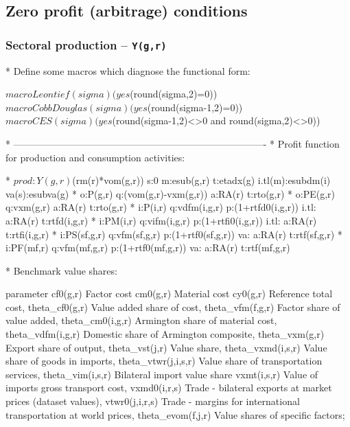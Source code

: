 \subsection*{Zero profit (arbitrage) conditions}

\subsubsection*{Sectoral production -- \texttt{Y(g,r)}}

\begin{GAMSCode*}
*       Define some macros which diagnose the functional form:

$macro  Leontief(sigma)         (yes$(round(sigma,2)=0))
$macro  CobbDouglas(sigma)      (yes$(round(sigma-1,2)=0))
$macro  CES(sigma)              (yes$(round(sigma-1,2)<>0 and round(sigma,2)<>0))

*       -------------------------------------------------------------------------------
*       Profit function for production and consumption activities:

* $prod:Y(g,r)$(rm(r)*vom(g,r)) s:0 m:esub(g,r) t:etadx(g) i.tl(m):esubdm(i)  va(s):esubva(g)
*       o:P(g,r)        q:(vom(g,r)-vxm(g,r))   a:RA(r)  t:rto(g,r)
*       o:PE(g,r)       q:vxm(g,r)              a:RA(r)  t:rto(g,r)
*       i:P(i,r)        q:vdfm(i,g,r)   p:(1+rtfd0(i,g,r)) i.tl:  a:RA(r) t:rtfd(i,g,r)
*       i:PM(i,r)       q:vifm(i,g,r)   p:(1+rtfi0(i,g,r)) i.tl:  a:RA(r) t:rtfi(i,g,r)
*       i:PS(sf,g,r)    q:vfm(sf,g,r)   p:(1+rtf0(sf,g,r))  va:   a:RA(r) t:rtf(sf,g,r)
*       i:PF(mf,r)      q:vfm(mf,g,r)   p:(1+rtf0(mf,g,r))  va:   a:RA(r) t:rtf(mf,g,r)

*       Benchmark value shares:

parameter
        cf0(g,r)                Factor cost
        cm0(g,r)                Material cost
        cy0(g,r)                Reference total cost,
        theta_cf0(g,r)          Value added share of cost,
        theta_vfm(f,g,r)        Factor share of value added,
        theta_cm0(i,g,r)        Armington share of material cost,
        theta_vdfm(i,g,r)       Domestic share of Armington composite,
        theta_vxm(g,r)          Export share of output,
        theta_vst(j,r)          Value share,
        theta_vxmd(i,s,r)       Value share of goods in imports,
        theta_vtwr(j,i,s,r)     Value share of transportation services,
        theta_vim(i,s,r)        Bilateral import value share
        vxmt(i,s,r)             Value of imports gross transport cost,
        vxmd0(i,r,s)            Trade - bilateral exports at market prices (dataset values),
        vtwr0(j,i,r,s)          Trade - margins for international transportation at world prices,
        theta_evom(f,j,r)       Value shares of specific factors;


\end{GAMSCode*}
